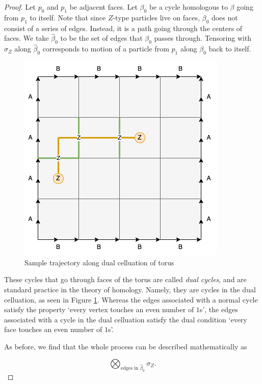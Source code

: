\documentclass{article}
\theoremstyle{definition}
\numberwithin{figure}{section}
\begin{document}
\begin{proof} Let $p_0$ and $p_1$ be adjacent faces. Let $\beta_0$ be a cycle homologous to $\beta$ going from $p_1$ to itself. Note that since $Z$-type particles live on faces, $\beta_0$ does not consist of a series of edges. Instead, it is a path going through the centers of faces. We take $\widehat{\beta}_0$ to be the set of edges that $\beta_0$ passes through. Tensoring with $\sigma_Z$ along $\widehat{\beta}_0$ corresponds to motion of a particle from $p_1$ along $\beta_0$ back to itself.

\begin{figure}
\begin{center}
\includegraphics[scale=0.30]{dual-celluation}
\caption{Sample trajectory along dual celluation of torus}
\label{fig:dual-celluation}
\end{center}
\end{figure}

These cycles that go through faces of the torus are called \textit{dual cycles}, and are standard practice in the theory of homology. Namely, they are cycles in the dual celluation, as seen in Figure \ref{fig:dual-celluation}. Whereas the edges associated with a normal cycle satisfy the property `every vertex touches an even number of $1$s', the edges associated with a cycle in the dual celluation satisfy the dual condition `every face touches an even number of $1$s'.

As before, we find that the whole process can be described mathematically as

$$\bigotimes_{\text{edges in }\widehat{\beta}_0}\sigma_Z.$$


\end{proof}
\end{document}
